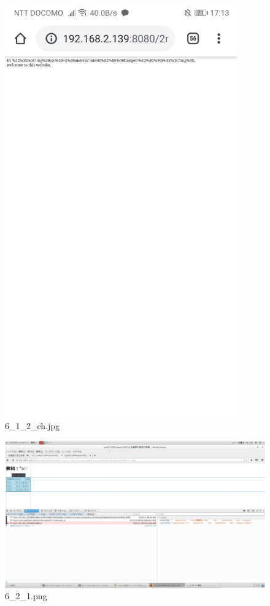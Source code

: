 \documentclass[a4j]{jarticle}
\begin{document}
  \vspace{1cm}
  \begin{figure}[htbp]
    \centering
    \includegraphics[width=10cm]{../webapp/png/6_1_2_ch.jpg}
    \caption{6\_1\_2\_ch.jpg}
  \end{figure}


  \vspace{1cm}
  \begin{figure}[htbp]
    \centering
    \includegraphics[width=13cm]{../webapp/png/6_2_1.png}
    \caption{6\_2\_1.png}
  \end{figure}
\end{document}
